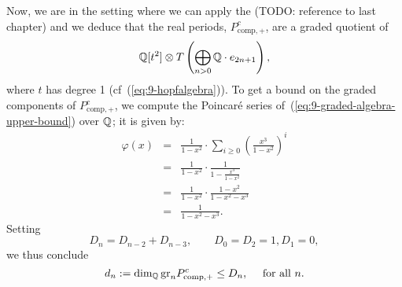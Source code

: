 Now, we are in the setting where we can apply the (TODO: reference to
last chapter) and we deduce that the real periods,
$P^c_{\mathrm{comp},+}$, are a graded quotient of
\begin{equation}\label{eq:9-graded-algebra-upper-bound}
  \mathbb{Q}[t^2] \otimes
  T\left(\bigoplus_{n > 0} \mathbb{Q}\cdot e_{2n+1}\right),
\end{equation}
where $t$ has degree 1 (cf~(\ref{eq:9-hopfalgebra})). To get a bound
on the graded components of $P^c_{\mathrm{comp},+}$, we
compute the Poincaré series
of~(\ref{eq:9-graded-algebra-upper-bound}) over $\mathbb{Q}$; it is given by:
\begin{eqnarray*}
\varphi(x) & = & \frac{1}{1-x^2} \cdot\sum_{i \geq 0}
\left(
\frac{x^3}{1-x^2}\right)^{i} \\
& = & \frac{1}{1-x^2} \cdot \frac{1}{1-\frac{x^3}{1-x^2}} \\
& = & \frac{1}{1-x^2} \cdot \frac{1-x^2}{1-x^2-x^3} \\
& = & \frac{1}{1-x^2-x^3}.
\end{eqnarray*}
Setting 
\begin{equation*}
D_n = D_{n-2} + D_{n-3}, \qquad D_0 = D_2 = 1, D_1 = 0,
\end{equation*}
we thus conclude
\begin{equation*}
d_n := \dim_{\mathbb{Q}} \mathrm{gr}_n P^c_{\mathrm{comp},+}\leq D_n,\quad\text{ for all }n.
\end{equation*}

